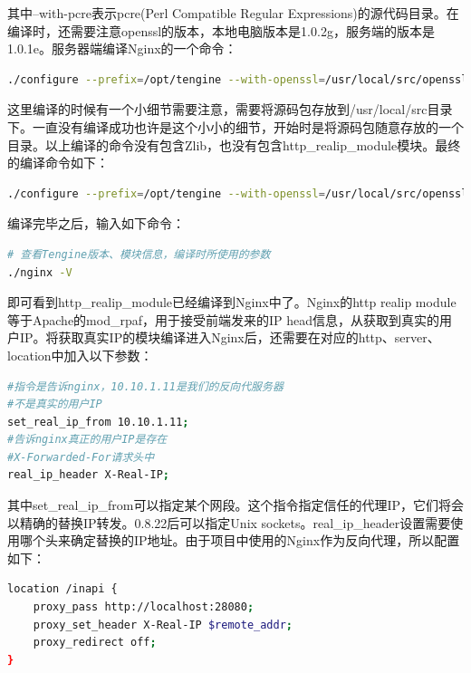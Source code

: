\documentclass[12pt]{book}
\numberwithin{dummy}{section}
\theoremstyle{ocrenumbox}
\theoremstyle{blacknumex}
\theoremstyle{blacknumbox}
\theoremstyle{ocrenum}
\begin{document}
其中--with-pcre表示pcre(Perl Compatible Regular Expressions)的源代码目录。在编译时，还需要注意openssl的版本，本地电脑版本是1.0.2g，服务端的版本是1.0.1e。服务器端编译Nginx的一个命令：

\begin{lstlisting}[language=bash]
./configure --prefix=/opt/tengine --with-openssl=/usr/local/src/openssl-OpenSSL_1_0_2g/ --without-http_gzip_module --with-pcre=/usr/local/src/pcre-8.40/
\end{lstlisting}

这里编译的时候有一个小细节需要注意，需要将源码包存放到/usr/local/src目录下。一直没有编译成功也许是这个小小的细节，开始时是将源码包随意存放的一个目录。以上编译的命令没有包含Zlib，也没有包含http\_realip\_module模块。最终的编译命令如下：

\begin{lstlisting}[language=bash]
./configure --prefix=/opt/tengine --with-openssl=/usr/local/src/openssl-OpenSSL_1_0_2g/ --with-pcre=/usr/local/src/pcre-8.40/ --with-zlib=/usr/local/src/zlib-1.2.11 --with-http_realip_module 
\end{lstlisting}

编译完毕之后，输入如下命令：

\begin{lstlisting}[language=bash]
# 查看Tengine版本、模块信息，编译时所使用的参数
./nginx -V
\end{lstlisting}

即可看到http\_realip\_module已经编译到Nginx中了。Nginx的http realip module等于Apache的mod\_rpaf，用于接受前端发来的IP head信息，从获取到真实的用户IP。将获取真实IP的模块编译进入Nginx后，还需要在对应的http、server、location中加入以下参数：

\begin{lstlisting}[language=bash]
#指令是告诉nginx，10.10.1.11是我们的反向代服务器
#不是真实的用户IP
set_real_ip_from 10.10.1.11;
#告诉nginx真正的用户IP是存在
#X-Forwarded-For请求头中
real_ip_header X-Real-IP;
\end{lstlisting}

其中set\_real\_ip\_from可以指定某个网段。这个指令指定信任的代理IP，它们将会以精确的替换IP转发。0.8.22后可以指定Unix sockets。real\_ip\_header设置需要使用哪个头来确定替换的IP地址。由于项目中使用的Nginx作为反向代理，所以配置如下：

\begin{lstlisting}[language=bash]
location /inapi {
	proxy_pass http://localhost:28080;
	proxy_set_header X-Real-IP $remote_addr;
	proxy_redirect off;
}
\end{lstlisting}
\end{document}
